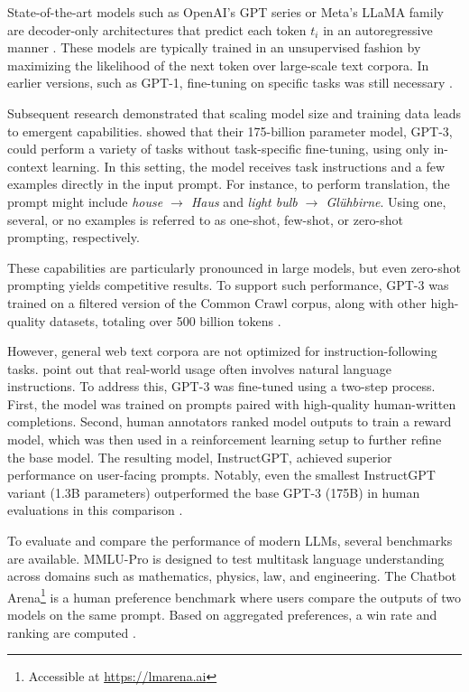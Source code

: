 \documentclass[a4paper,oneside,bibliography=totoc]{scrbook}
\begin{document}
State-of-the-art models such as OpenAI’s \ac{GPT} series or Meta’s \ac{LLaMA} family are decoder-only architectures that predict each token $t_i$ in an autoregressive manner \cite{Radford2018,Grattafiori2024}. These models are typically trained in an unsupervised fashion by maximizing the likelihood of the next token over large-scale text corpora. In earlier versions, such as GPT-1, fine-tuning on specific tasks was still necessary \cite{Radford2018}.

Subsequent research demonstrated that scaling model size and training data leads to emergent capabilities. \citet{Brown2020} showed that their 175-billion parameter model, GPT-3, could perform a variety of tasks without task-specific fine-tuning, using only in-context learning. In this setting, the model receives task instructions and a few examples directly in the input prompt. For instance, to perform translation, the prompt might include \textit{house $\rightarrow$ Haus} and \textit{light bulb $\rightarrow$ Glühbirne}. Using one, several, or no examples is referred to as one-shot, few-shot, or zero-shot prompting, respectively.

These capabilities are particularly pronounced in large models, but even zero-shot prompting yields competitive results. To support such performance, GPT-3 was trained on a filtered version of the Common Crawl corpus, along with other high-quality datasets, totaling over 500 billion tokens \cite{Brown2020}.

However, general web text corpora are not optimized for instruction-following tasks. \citet{Ouyang2022} point out that real-world usage often involves natural language instructions. To address this, GPT-3 was fine-tuned using a two-step process. First, the model was trained on prompts paired with high-quality human-written completions. Second, human annotators ranked model outputs to train a reward model, which was then used in a reinforcement learning setup to further refine the base model. The resulting model, InstructGPT, achieved superior performance on user-facing prompts. Notably, even the smallest InstructGPT variant (1.3B parameters) outperformed the base GPT-3 (175B) in human evaluations in this comparison \cite{Ouyang2022}.

To evaluate and compare the performance of modern \acp{LLM}, several benchmarks are available. MMLU-Pro \cite{Wang2024} is designed to test multitask language understanding across domains such as mathematics, physics, law, and engineering. The Chatbot Arena\footnote{Accessible at \url{https://lmarena.ai}} is a human preference benchmark where users compare the outputs of two models on the same prompt. Based on aggregated preferences, a win rate and ranking are computed \cite{Chiang2024}.
\end{document}
